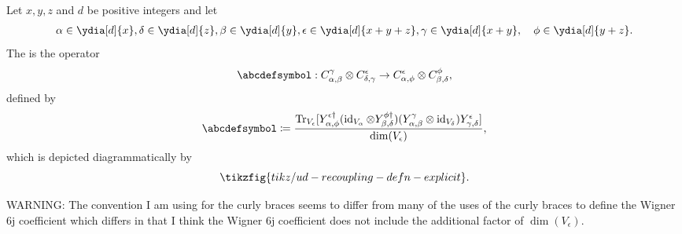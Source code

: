 \documentclass[notitlepage, 10pt]{article}
\begin{document}
\begin{defn}
    \label{defn:ud_recoupling_operator}
    Let $x,y,z$ and $d$ be positive integers and let 
    \begin{align}
            \alpha \in \ydia[d]{x},
            \delta \in \ydia[d]{z},
            \beta \in \ydia[d]{y},
            \epsilon \in \ydia[d]{x+y+z},
            \gamma \in \ydia[d]{x+y},
            \quad \phi \in \ydia[d]{y+z}.
    \end{align}
    The  is the operator
    \begin{equation}
        \abcdefsymbol
        :
        C^{\gamma}_{\alpha,\beta} \ot C^{\epsilon}_{\delta,\gamma} \to C^{\epsilon}_{\alpha, \phi} \ot C^{\phi}_{\beta,\delta},
    \end{equation}
    defined by
    \begin{equation}
        \abcdefsymbol 
        \coloneqq
        \frac{
            \Tr_{V_{\epsilon}}[
            Y_{\alpha,\phi}^{\epsilon\dagger}
            (\id_{V_{\alpha}}\ot Y_{\beta,\delta}^{\phi\dagger})
            (Y_{\alpha,\beta}^{\gamma}\ot\id_{V_{\delta}})
            Y_{\gamma,\delta}^{\epsilon}
            ]
        }{\dim(V_{\epsilon})},
    \end{equation}
    which is depicted diagrammatically by
    \begin{equation}
        \tikzfig{tikz/ud-recoupling-defn-explicit}.
    \end{equation}
\end{defn}
{\color{red}
    WARNING: The convention I am using for the curly braces seems to differ from many of the uses of the curly braces to define the Wigner 6j coefficient which differs in that I think the Wigner 6j coefficient does not include the additional factor of $\dim(V_{\epsilon})$.
}
\end{document}

